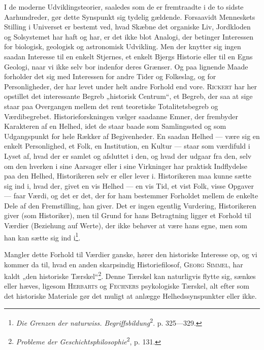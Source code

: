 \documentclass[12pt]{article}
\newcommand{\opage}[1]{\marginnote{\footnotesize\textit{[#1]}}}
\begin{document}
\setcounter{footnote}{0}%
\opage{71}I de moderne Udviklingsteorier, saaledes som de er fremtraadte i de to
sidste Aarhundreder, gør dette Synspunkt sig tydelig gældende. Forsaavidt
Menneskets Stilling i Universet er bestemt ved, hvad Skæbne det organiske Liv,
Jordkloden og Solsystemet har haft og har, er det ikke blot Analogi, der
betinger Interessen for biologisk, geologisk og astronomisk Udvikling. Men der
knytter sig ingen saadan Interesse til en enkelt Stjernes, et enkelt Bjergs
Historie eller til en Egns Geologi, naar vi ikke selv bor indenfor deres
Grænser. Og paa lignende Maade forholder det sig med Interessen for andre Tider
og Folkeslag, og for Personligheder, der har levet under helt andre Forhold end
vore. \textsc{Rickert} har her opstillet det interessante Begreb „historisk
Centrum“, et Begreb, der saa at sige staar paa Overgangen mellem det rent
teoretiske Totalitetsbegreb og Værdibegrebet. Historieforskningen vælger
saadanne Emner, der frembyder Karakteren af en Helhed, idet de staar baade som
Samlingssted og som Udgangspunkt for hele Rækker af Begivenheder. En saadan
Helhed --- være sig en enkelt Personlighed, et Folk, en Institution, en Kultur
--- staar som værdifuld i Lyset af, hvad der er samlet og afsluttet i den, og
hvad der udgaar fra den, selv om den hverken i sine Aarsager eller i sine
Virkninger har praktisk Indflydelse paa den Helhed, Historikeren selv er eller
lever i. Historikeren maa kunne sætte sig ind i, hvad der, givet en vis Helhed
--- en vis Tid, et vist Folk, visse Opgaver --- faar Værdi, og det er det, der
for ham bestemmer Forholdet mellem de enkelte Dele af den Fremstilling, han
giver. Det er ingen egentlig Vurdering, Historikeren giver (som Historiker), men
til Grund for hans Betragtning ligger et Forhold til Værdier (Beziehung auf
Werte), der ikke behøver at være hans egne, men som han kan sætte sig ind
i\footnote{\textit{Die Grenzen der naturwiss.
Begriffsbildung}\textsuperscript{2}. p. 325---329.}.

Mangler dette Forhold til Værdier ganske, hører den historiske Interesse op, og
vi kommer da til, hvad en anden skarpsindig Historiefilosof, \textsc{Georg
Simmel}, har kaldt „den historiske Tærskel“\footnote{\textit{Probleme der
Geschichtsphilosophie}\textsuperscript{2}, p. 131.}. Denne Tærskel kan
naturligvis flytte sig, sænkes eller hæves, ligesom \textsc{Herbarts} og
\textsc{Fechners} psykologiske Tærskel, alt efter som det historiske Materiale
gør det muligt at anlægge Helhedssynspunkter eller ikke.
\end{document}

